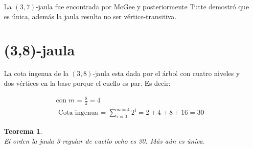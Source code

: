 \documentclass[12pt]{book}
\newtheorem{theorem}{Teorema}
\theoremstyle{definition}
\begin{document}
La $(3,7)$-jaula fue encontrada por McGee y posteriormente Tutte
demostró que es única, además la jaula resulto no ser
vértice-transitiva.


\section{(3,8)-jaula}

La cota ingenua de la $(3,8)$-jaula esta dada por el árbol con cuatro
niveles y dos vértices en la base porque el cuello es par. Es decir:

\begin{equation*}
\begin{split}
&\text{con $m$ = } \frac{8}{2} = 4\\
&\text{ Cota ingenua = } \sum^{m=4}_{i=0} 2^i=2+4+8+16=30 
\end{split}
\end{equation*}

\begin{theorem}\textbf{}\\\label{teo(3,8)-jaula}
El orden la jaula 3-regular de cuello ocho es 30. Más aún es única. 
\end{theorem}
\end{document}
